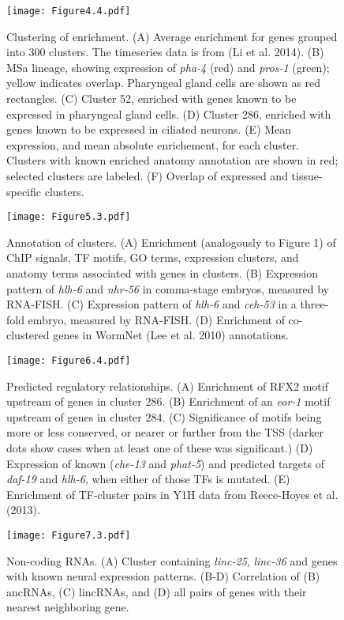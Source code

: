 \documentclass{article}
\begin{document}
\begin{figure}
\texttt{[image: Figure4.4.pdf]}
\caption{
Clustering of enrichment.
(A) Average enrichment for genes grouped into 300 clusters. The timeseries data is from (Li et al. 2014). (B) MSa lineage, showing expression of {\em pha-4} (red) and {\em pros-1} (green); yellow indicates overlap. Pharyngeal gland cells are shown as red rectangles. (C) Cluster 52, enriched with genes known to be expressed in pharyngeal gland cells. (D) Cluster 286, enriched with genes known to be expressed in ciliated neurons. (E) Mean expression, and mean absolute enrichement, for each cluster. Clusters with known enriched anatomy annotation are shown in red; selected clusters are labeled. (F) Overlap of expressed and tissue-specific clusters.
}
\end{figure}
\clearpage

\begin{figure}
\texttt{[image: Figure5.3.pdf]}
\caption{
Annotation of clusters.
(A) Enrichment (analogously to Figure 1) of ChIP signals, TF motifs, GO terms, expression clusters, and anatomy terms associated with genes in clusters. (B) Expression pattern of {\em hlh-6} and {\em nhr-56}
 in comma-stage embryos, measured by RNA-FISH. (C) Expression pattern of {\em hlh-6} and {\em ceh-53} in a three-fold embryo, measured by RNA-FISH.
(D) Enrichment of co-clustered genes in WormNet (Lee et al. 2010) annotations.
}
\end{figure}
\clearpage

\begin{figure}
\texttt{[image: Figure6.4.pdf]}
\caption{Predicted regulatory relationships.
(A) Enrichment of RFX2 motif upstream of genes in cluster 286. (B) Enrichment of an
{\em eor-1} motif upstream of genes in cluster 284. (C) Significance of motifs being more or less conserved, or nearer or further from the TSS (darker dots show cases when
at least one of these was significant.) (D) Expression of known ({\em che-13} and
{\em phat-5}) and predicted targets of {\em daf-19} and {\em hlh-6}, when either of
those TFs is mutated.
 (E) Enrichment of TF-cluster pairs in Y1H data from Reece-Hoyes et al. (2013).
}
\end{figure}
\clearpage

\begin{figure}
\texttt{[image: Figure7.3.pdf]}
\caption{
Non-coding RNAs.
(A) Cluster containing {\em linc-25}, {\em linc-36}
 and genes with known neural expression patterns. (B-D) Correlation of (B) ancRNAs, (C) lincRNAs, and (D) all pairs of genes with their nearest neighboring gene.
}
\end{figure}
\clearpage
\end{document}
